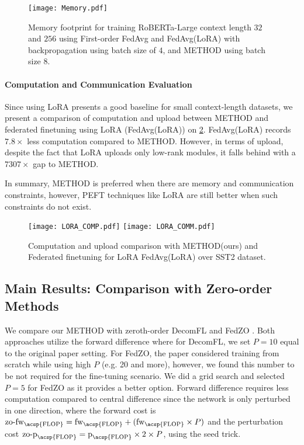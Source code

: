 \begin{figure}
    \centering
    \texttt{[image: Memory.pdf]}
    \caption{Memory footprint for training RoBERTa-Large context length $32$ and $256$ using First-order FedAvg and FedAvg(LoRA) with backpropagation using batch size of $4$, and \ac{METHOD} using batch size $8$.}
    \label{fig:memory_fo}
\end{figure}


\paragraph{Computation and Communication Evaluation}
Since using LoRA presents a good baseline for small context-length datasets, we present a comparison of computation and upload between \ac{METHOD} and federated finetuning using LoRA (FedAvg(LoRA)) on \cref{fig:lora}. FedAvg(LoRA) records $7.8\times$ less computation compared to \ac{METHOD}. However, in terms of upload, despite the fact that LoRA uploads only low-rank modules, it falls behind with a $7307\times$ gap to \ac{METHOD}.

In summary, \ac{METHOD} is preferred when there are memory and communication constraints, however, \ac{PEFT} techniques like LoRA are still better when such constraints do not exist. 



\begin{figure}
    \centering
    \texttt{[image: LORA\_COMP.pdf]}
    \texttt{[image: LORA\_COMM.pdf]}
    \caption{Computation and upload comparison with \ac{METHOD}(ours) and Federated finetuning for LoRA FedAvg(LoRA) over SST2 dataset.}
    \label{fig:lora}    
\end{figure}






\subsection{Main Results: Comparison with Zero-order Methods}

 We compare our \ac{METHOD} with zeroth-order DecomFL \cite{decomfl_cite} and FedZO \cite{fang2022communication}. Both approaches utilize the forward difference where for DecomFL, we set $P=10$ equal to the original paper setting. For FedZO, the paper considered training from scratch while using high $P$ (e.g. 20 and more), however, we found this number to be not required for the fine-tuning scenario. We did a grid search and selected $P=5$ for FedZO as it provides a better option. Forward difference requires less computation compared to central difference since the network is only perturbed in one direction, where the forward cost is $\text{zo-fw}_{\text{\acsp{FLOP}}} = \text{fw}_{\text{\acsp{FLOP}}} + (\text{fw}_{\text{\acsp{FLOP}}} \times P)$ and the perturbation cost $\text{zo-p}_{\text{\acsp{FLOP}}} = \text{p}_{\text{\acsp{FLOP}}} \times 2 \times P$, using the seed trick. 
 
